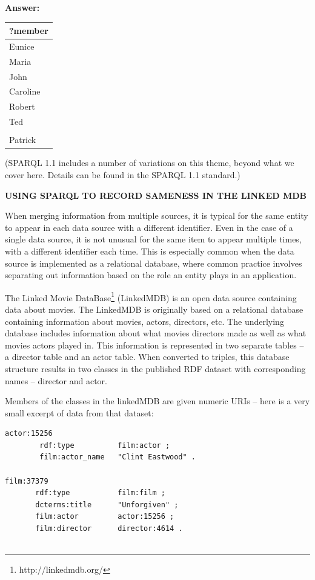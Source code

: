 \textbf{\textbf{Answer:}}

\begin{tabular}{|l|}
\hline
?member\\
\hline
Eunice\\
Maria\\
John\\
Caroline\\
Robert\\
Ted\\
\\
Patrick\\
\hline
\end{tabular}

(SPARQL 1.1 includes a number of variations on this theme, beyond what
we cover here. Details can be found in the SPARQL 1.1 standard.)

\begin{challenge} 
\textbf{USING SPARQL TO RECORD SAMENESS IN THE LINKED MDB}
\label{chal:3}

When merging information from multiple sources, it is typical for the
same entity to appear in each data source with a different identifier.
Even in the case of a single data source, it is not unusual for the same
item to appear multiple times, with a different identifier each time.
This is especially common when the data source is implemented as a
relational database, where common practice involves separating out
information based on the role an entity plays in an application.

The Linked Movie DataBase\footnote{http://linkedmdb.org/} (LinkedMDB) is an open data source containing
data about movies. The LinkedMDB is originally based on a relational database
containing information about movies, actors, directors, etc. The
underlying database includes information about what movies directors
made as well as what movies actors played in. This information is
represented in two separate tables -- a director table and an actor
table. When converted to triples, this database structure results in two
classes in the published RDF dataset with corresponding names --
director and actor.

Members of the classes in the linkedMDB are given numeric URIs -- here
is a very small excerpt of data from that dataset:

\begin{lstlisting}
actor:15256 
        rdf:type          film:actor ;
        film:actor_name   "Clint Eastwood" .

film:37379
       rdf:type           film:film ;
       dcterms:title      "Unforgiven" ;
       film:actor         actor:15256 ;
       film:director      director:4614 .


\end{lstlisting}
\end{challenge}
